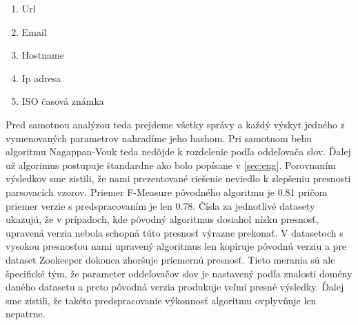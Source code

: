 \begin{enumerate}
  \item Url
  \item Email
  \item Hostname
  \item Ip adresa
  \item ISO časová známka
\end{enumerate}

Pred samotnou analýzou teda prejdeme všetky správy a každý výskyt jedného z vymenovaných parametrov nahradíme jeho hashom. Pri samotnom behu algoritmu Nagappan-Vouk teda nedôjde k rozdelenie podľa oddeľovača slov. Ďalej už algorimus postupuje štandardne ako bolo popísane v \ref{sec:eng}. Porovnaním výsledkov sme zistili, že nami prezentované riešenie neviedlo k zlepšeniu presnosti parsovacích vzorov. Priemer F-Measure pôvodného algoritmu je 0.81 pričom priemer verzie s predspracovaním je len 0.78. Čísla za jednotlivé datasety ukazujú, že v prípadoch, kde pôvodný algoritmus dosiahol nízku presnosť, upravená verzia nebola schopná túto presnosť výrazne prekonať. V datasetoch s vysokou presnosťou nami upravený algoritmus len kopíruje pôvodnú verziu a pre dataset Zookeeper dokonca zhoršuje priemernú presnosť. Tieto merania sú ale špecifické tým, že parameter oddeľovačov slov je nastavený podľa znalosti domény daného datasetu a preto pôvodná verzia produkuje veľmi presné výsledky. Ďalej sme zistili, že takéto predspracovanie výkonnosť algoritmu ovplyvňuje len nepatrne.